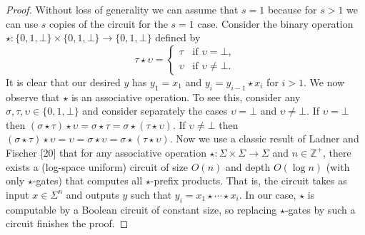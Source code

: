 \documentclass[10pt,a4paper]{article}
\newcommand{\ZZ}{\mathbb Z}
\begin{document}
\begin{proof}
Without loss of generality we can assume that $s=1$ because for $s>1$ we can use $s$ copies of the circuit for the $s=1$ case.
Consider the binary operation $\star:\{0,1,\bot\}\times\{0,1,\bot\}\to\{0,1,\bot\}$ defined by
\[\tau\star\upsilon=\begin{cases}\tau&\text{if }\upsilon=\bot,\\\upsilon&\text{if }\upsilon\ne\bot.\end{cases}\]
It is clear that our desired $y$ has $y_1=x_1$ and $y_i=y_{i-1}\star x_i$ for $i>1$.
We now observe that $\star$ is an associative operation. To see this, consider any $\sigma,\tau,\upsilon\in\{0,1,\bot\}$ and consider separately the cases $\upsilon=\bot$ and $\upsilon\ne\bot$. If $\upsilon=\bot$ then $(\sigma\star\tau)\star\upsilon=\sigma\star\tau=\sigma\star(\tau\star\upsilon)$. If $\upsilon\ne\bot$ then $(\sigma\star\tau)\star\upsilon=\upsilon=\sigma\star\upsilon=\sigma\star(\tau\star\upsilon)$.
Now we use a classic result of Ladner and Fischer [20] that for any associative operation $\star:\Sigma\times\Sigma\to\Sigma$ and $n\in\ZZ^+$, there exists a (log-space uniform) circuit of size $O(n)$ and depth $O(\log n)$ (with only $\star$-gates) that computes all $\star$-prefix products. That is, the circuit takes as input $x\in\Sigma^n$ and outputs $y$ such that $y_i=x_1\star\cdots\star x_i$.
In our case, $\star$ is computable by a Boolean circuit of constant size, so replacing $\star$-gates by such a circuit finishes the proof.
\end{proof}
\end{document}
